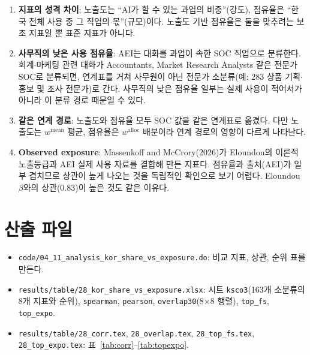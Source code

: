 \documentclass[11pt]{article}
\begin{document}
\begin{enumerate}[leftmargin=*]
  \item \textbf{지표의 성격 차이}: 노출도는 ``AI가 할 수 있는 과업의 비중''(강도), 점유율은 ``한국 전체 사용 중 그 직업의 몫''(규모)이다. 노출도 기반 점유율은 둘을 맞추려는 보조 지표일 뿐 표준 지표가 아니다.
  \item \textbf{사무직의 낮은 사용 점유율}: AEI는 대화를 과업이 속한 SOC 직업으로 분류한다. 회계$\cdot$마케팅 관련 대화가 Accountants, Market Research Analysts 같은 전문가 SOC로 분류되면, 연계표를 거쳐 사무원이 아닌 전문가 소분류(예: 283 상품 기획$\cdot$홍보 및 조사 전문가)로 간다. 사무직의 낮은 점유율 일부는 실제 사용이 적어서가 아니라 이 분류 경로 때문일 수 있다.
  \item \textbf{같은 연계 경로}: 노출도와 점유율 모두 SOC 값을 같은 연계표로 옮겼다. 다만 노출도는 $w^{\text{mean}}$ 평균, 점유율은 $w^{\text{alloc}}$ 배분이라 연계 경로의 영향이 다르게 나타난다.
  \item \textbf{Observed exposure}: Massenkoff and McCrory(2026)가 Eloundou의 이론적 노출등급과 AEI 실제 사용 자료를 결합해 만든 지표다. 점유율과 출처(AEI)가 일부 겹치므로 상관이 높게 나오는 것을 독립적인 확인으로 보기 어렵다. Eloundou $\beta$와의 상관(0.83)이 높은 것도 같은 이유다.
\end{enumerate}

\section{산출 파일}

\begin{itemize}[leftmargin=*]
  \item \texttt{code/04\_11\_analysis\_kor\_share\_vs\_exposure.do}: 비교 지표, 상관, 순위 표를 만든다.
  \item \texttt{results/table/28\_kor\_share\_vs\_exposure.xlsx}: 시트 \texttt{ksco3}(163개 소분류의 8개 지표와 순위), \texttt{spearman}, \texttt{pearson}, \texttt{overlap30}(8$\times$8 행렬), \texttt{top\_fs}, \texttt{top\_expo}.
  \item \texttt{results/table/28\_corr.tex}, \texttt{28\_overlap.tex}, \texttt{28\_top\_fs.tex}, \texttt{28\_top\_expo.tex}: 표~\ref{tab:corr}--\ref{tab:topexpo}.
\end{itemize}
\end{document}
